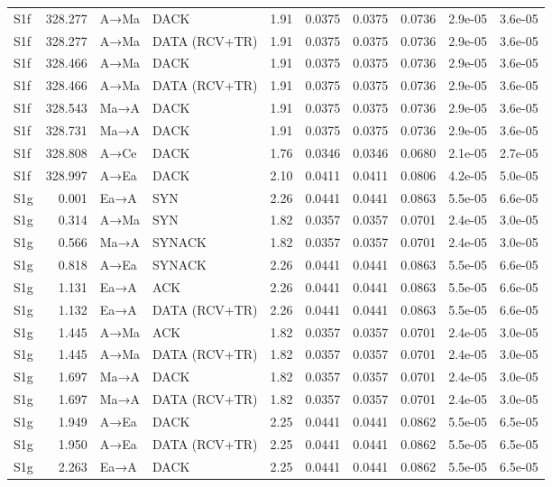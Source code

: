 \documentclass[10pt,letterpaper]{article}
\begin{document}
{\begin{longtable}{@{}lrllrrrrrr@{}}
S1f & 328.277 & A→Ma & DACK & 1.91 & 0.0375 & 0.0375 & 0.0736 & 2.9e-05 & 3.6e-05 \\
S1f & 328.277 & A→Ma & DATA (RCV+TR) & 1.91 & 0.0375 & 0.0375 & 0.0736 & 2.9e-05 & 3.6e-05 \\
S1f & 328.466 & A→Ma & DACK & 1.91 & 0.0375 & 0.0375 & 0.0736 & 2.9e-05 & 3.6e-05 \\
S1f & 328.466 & A→Ma & DATA (RCV+TR) & 1.91 & 0.0375 & 0.0375 & 0.0736 & 2.9e-05 & 3.6e-05 \\
S1f & 328.543 & Ma→A & DACK & 1.91 & 0.0375 & 0.0375 & 0.0736 & 2.9e-05 & 3.6e-05 \\
S1f & 328.731 & Ma→A & DACK & 1.91 & 0.0375 & 0.0375 & 0.0736 & 2.9e-05 & 3.6e-05 \\
S1f & 328.808 & A→Ce & DACK & 1.76 & 0.0346 & 0.0346 & 0.0680 & 2.1e-05 & 2.7e-05 \\
S1f & 328.997 & A→Ea & DACK & 2.10 & 0.0411 & 0.0411 & 0.0806 & 4.2e-05 & 5.0e-05 \\
S1g & 0.001 & Ea→A & SYN & 2.26 & 0.0441 & 0.0441 & 0.0863 & 5.5e-05 & 6.6e-05 \\
S1g & 0.314 & A→Ma & SYN & 1.82 & 0.0357 & 0.0357 & 0.0701 & 2.4e-05 & 3.0e-05 \\
S1g & 0.566 & Ma→A & SYNACK & 1.82 & 0.0357 & 0.0357 & 0.0701 & 2.4e-05 & 3.0e-05 \\
S1g & 0.818 & A→Ea & SYNACK & 2.26 & 0.0441 & 0.0441 & 0.0863 & 5.5e-05 & 6.6e-05 \\
S1g & 1.131 & Ea→A & ACK & 2.26 & 0.0441 & 0.0441 & 0.0863 & 5.5e-05 & 6.6e-05 \\
S1g & 1.132 & Ea→A & DATA (RCV+TR) & 2.26 & 0.0441 & 0.0441 & 0.0863 & 5.5e-05 & 6.6e-05 \\
S1g & 1.445 & A→Ma & ACK & 1.82 & 0.0357 & 0.0357 & 0.0701 & 2.4e-05 & 3.0e-05 \\
S1g & 1.445 & A→Ma & DATA (RCV+TR) & 1.82 & 0.0357 & 0.0357 & 0.0701 & 2.4e-05 & 3.0e-05 \\
S1g & 1.697 & Ma→A & DACK & 1.82 & 0.0357 & 0.0357 & 0.0701 & 2.4e-05 & 3.0e-05 \\
S1g & 1.697 & Ma→A & DATA (RCV+TR) & 1.82 & 0.0357 & 0.0357 & 0.0701 & 2.4e-05 & 3.0e-05 \\
S1g & 1.949 & A→Ea & DACK & 2.25 & 0.0441 & 0.0441 & 0.0862 & 5.5e-05 & 6.5e-05 \\
S1g & 1.950 & A→Ea & DATA (RCV+TR) & 2.25 & 0.0441 & 0.0441 & 0.0862 & 5.5e-05 & 6.5e-05 \\
S1g & 2.263 & Ea→A & DACK & 2.25 & 0.0441 & 0.0441 & 0.0862 & 5.5e-05 & 6.5e-05 \\

\end{longtable}}
\end{document}
